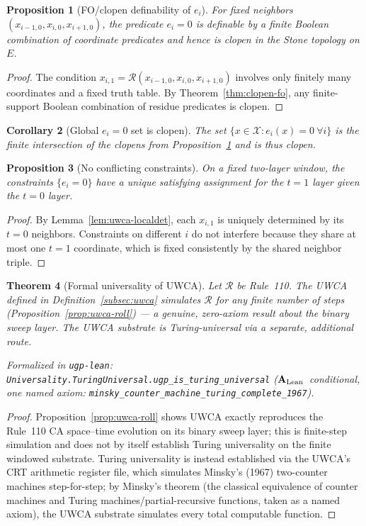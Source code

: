 \documentclass[12pt]{article}
\newtheorem{theorem}{Theorem}[section]
\newtheorem{corollary}[theorem]{Corollary}
\newtheorem{proposition}[theorem]{Proposition}
\numberwithin{equation}{section}
\newcommand{\CatAL}{\ensuremath{\textbf{A}_{\rm Lean}}}
\begin{document}
\begin{proposition}[FO/clopen definability of $e_i$]\label{prop:uwca-clopen}
For fixed neighbors $(x_{i-1,0},x_{i,0},x_{i+1,0})$, the predicate $e_i=0$ is definable by a finite Boolean combination of coordinate predicates and hence is clopen in the Stone topology on $E$.
\end{proposition}
\begin{proof}
The condition $x_{i,1}=\mathbf{\mathcal{R}}(x_{i-1,0},x_{i,0},x_{i+1,0})$ involves only finitely many coordinates and a fixed truth table. By Theorem~\ref{thm:clopen-fo}, any finite-support Boolean combination of residue predicates is clopen.
\end{proof}

\begin{corollary}[Global $e_i=0$ set is clopen]
The set $\{x\in\mathscr{X}: e_i(x)=0\ \forall i\}$ is the finite intersection of the clopens from Proposition~\ref{prop:uwca-clopen} and is thus clopen.
\end{corollary}

\begin{proposition}[No conflicting constraints]\label{prop:uwca-noconflict}
On a fixed two-layer window, the constraints $\{e_i=0\}$ have a unique satisfying assignment for the $t{=}1$ layer given the $t{=}0$ layer.
\end{proposition}
\begin{proof}
By Lemma~\ref{lem:uwca-localdet}, each $x_{i,1}$ is uniquely determined by its $t{=}0$ neighbors. Constraints on different $i$ do not interfere because they share at most one $t{=}1$ coordinate, which is fixed consistently by the shared neighbor triple.
\end{proof}

\begin{theorem}[Formal universality of UWCA]\label{thm:uwca-formal}
Let $\mathcal{R}$ be Rule~110. The UWCA defined in Definition~\ref{subsec:uwca} simulates $\mathcal{R}$ for any finite number of steps (Proposition~\ref{prop:uwca-roll}) --- a genuine, zero-axiom result about the binary sweep layer. The UWCA substrate is Turing-universal via a separate, additional route.

\noindent\emph{Formalized in} \texttt{ugp-lean}: \texttt{Universality.TuringUniversal.ugp\_is\_turing\_universal}
(\CatAL\ conditional, one named axiom: \texttt{minsky\_counter\_machine\_turing\_complete\_1967}).
\end{theorem}
\begin{proof}
Proposition~\ref{prop:uwca-roll} shows UWCA exactly reproduces the Rule~110 CA space–time evolution on its binary sweep layer; this is finite-step simulation and does not by itself establish Turing universality on the finite windowed substrate. Turing universality is instead established via the UWCA's CRT arithmetic register file, which simulates Minsky's (1967) two-counter machines step-for-step; by Minsky's theorem (the classical equivalence of counter machines and Turing machines/partial-recursive functions, taken as a named axiom), the UWCA substrate simulates every total computable function.
\end{proof}
\end{document}
